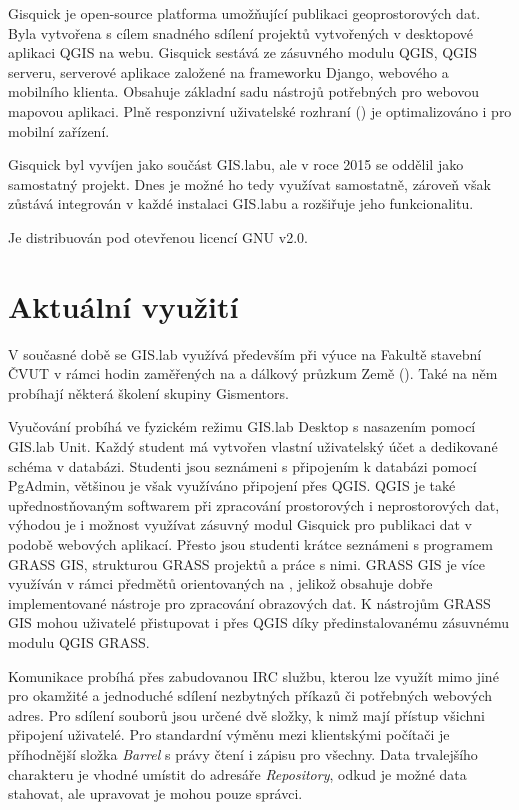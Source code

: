 Gisquick je open-source platforma umožňující publikaci geoprostorových dat. Byla vytvořena s cílem snadného sdílení projektů vytvořených v desktopové aplikaci QGIS na webu. Gisquick sestává ze zásuvného modulu QGIS, QGIS serveru, serverové aplikace založené na frameworku Django, webového a mobilního klienta. Obsahuje základní sadu nástrojů potřebných pro webovou mapovou aplikaci. Plně responzivní uživatelské rozhraní () je optimalizováno i pro mobilní zařízení.

Gisquick byl vyvíjen jako součást GIS.labu, ale v roce 2015 se oddělil jako samostatný projekt. Dnes je možné ho tedy využívat samostatně, zároveň však zůstává integrován v každé instalaci GIS.labu a rozšiřuje jeho funkcionalitu.

Je distribuován pod otevřenou licencí GNU  v2.0.

\section{Aktuální využití}
\label{gislab-vyuziti}

V současné době se GIS.lab využívá především při výuce na Fakultě stavební ČVUT v rámci hodin zaměřených na  a dálkový průzkum Země (). Také na něm probíhají některá školení skupiny Gismentors. 

Vyučování probíhá ve fyzickém režimu GIS.lab Desktop s nasazením pomocí GIS.lab Unit. Každý student má vytvořen vlastní uživatelský účet a dedikované schéma v databázi. Studenti jsou seznámeni s připojením k databázi pomocí PgAdmin, většinou je však využíváno připojení přes QGIS. QGIS je také upřednostňovaným softwarem při zpracování prostorových i neprostorových dat, výhodou je i možnost využívat zásuvný modul Gisquick pro publikaci dat v podobě webových aplikací. Přesto jsou studenti krátce seznámeni s programem GRASS GIS, strukturou GRASS projektů a práce s nimi. GRASS GIS je více využíván v rámci předmětů orientovaných na , jelikož obsahuje dobře implementované nástroje pro zpracování obrazových dat. K nástrojům GRASS GIS mohou uživatelé přistupovat i přes QGIS  díky předinstalovanému zásuvnému modulu QGIS GRASS.

Komunikace probíhá přes zabudovanou IRC službu, kterou lze využít mimo jiné pro okamžité a jednoduché sdílení nezbytných příkazů či potřebných webových adres. Pro sdílení souborů jsou určené dvě složky, k nimž mají přístup všichni připojení uživatelé. Pro standardní výměnu mezi klientskými počítači je příhodnější složka \textit{Barrel} s právy čtení i zápisu pro všechny. Data trvalejšího charakteru je vhodné umístit do adresáře \textit{Repository}, odkud je možné data stahovat, ale upravovat je mohou pouze správci.

